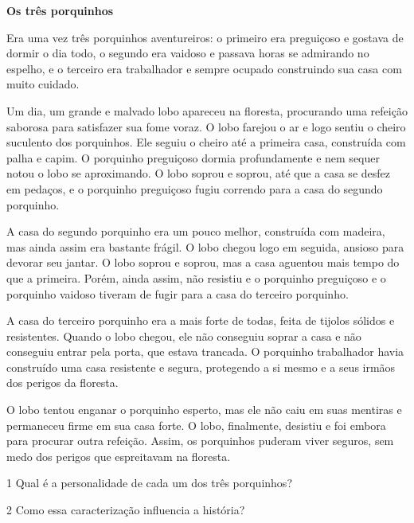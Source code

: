\begin{myquote}
\textbf{Os três porquinhos}

Era uma vez três porquinhos aventureiros: o primeiro era preguiçoso e
gostava de dormir o dia todo, o segundo era vaidoso e passava horas se
admirando no espelho, e o terceiro era trabalhador e sempre ocupado
construindo sua casa com muito cuidado.

Um dia, um grande e malvado lobo apareceu na floresta, procurando uma
refeição saborosa para satisfazer sua fome voraz. O lobo farejou o ar e
logo sentiu o cheiro suculento dos porquinhos. Ele seguiu o cheiro até a
primeira casa, construída com palha e capim. O porquinho preguiçoso
dormia profundamente e nem sequer notou o lobo se aproximando. O lobo
soprou e soprou, até que a casa se desfez em pedaços, e o porquinho
preguiçoso fugiu correndo para a casa do segundo porquinho.

A casa do segundo porquinho era um pouco melhor, construída com madeira,
mas ainda assim era bastante frágil. O lobo chegou logo em seguida,
ansioso para devorar seu jantar. O lobo soprou e soprou, mas a casa
aguentou mais tempo do que a primeira. Porém, ainda assim, não resistiu e
o porquinho preguiçoso e o porquinho vaidoso tiveram de fugir para a casa
do terceiro porquinho.

A casa do terceiro porquinho era a mais forte de todas, feita de tijolos
sólidos e resistentes. Quando o lobo chegou, ele não conseguiu soprar a
casa e não conseguiu entrar pela porta, que estava trancada. O porquinho
trabalhador havia construído uma casa resistente e segura, protegendo a
si mesmo e a seus irmãos dos perigos da floresta.

O lobo tentou enganar o porquinho esperto, mas ele não caiu em suas
mentiras e permaneceu firme em sua casa forte. O lobo, finalmente,
desistiu e foi embora para procurar outra refeição. Assim, os porquinhos
puderam viver seguros, sem medo dos perigos que espreitavam na floresta.

\end{myquote}


\num{1} Qual é a personalidade de cada um dos três porquinhos?



\num{2} Como essa caracterização influencia a história?

